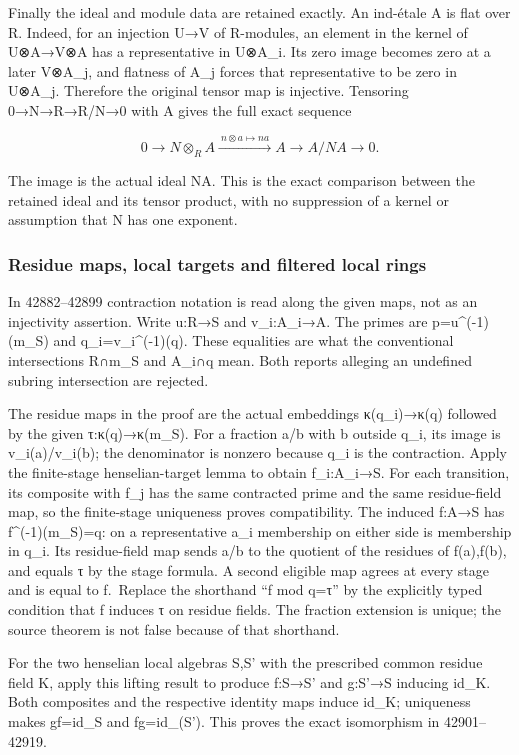 Finally the ideal and module data are retained exactly. An ind-étale A is flat over R. Indeed, for an injection U→V of R-modules, an element in the kernel of U⊗A→V⊗A has a representative in U⊗A\_i. Its zero image becomes zero at a later V⊗A\_j, and flatness of A\_j forces that representative to be zero in U⊗A\_j. Therefore the original tensor map is injective. Tensoring 0→N→R→R/N→0 with A gives the full exact sequence

\[
0\longrightarrow N\otimes_R A
 \xrightarrow{\ n\otimes a\mapsto na\ } A
 \longrightarrow A/NA\longrightarrow0.
\]

The image is the actual ideal NA. This is the exact comparison between the retained ideal and its tensor product, with no suppression of a kernel or assumption that N has one exponent.

\subsubsection{Residue maps, local targets and filtered local rings}\label{residue-maps-local-targets-and-filtered-local-rings}

In 42882--42899 contraction notation is read along the given maps, not as an injectivity assertion. Write u:R→S and v\_i:A\_i→A. The primes are p=u\^{}(-1)(m\_S) and q\_i=v\_i\^{}(-1)(q). These equalities are what the conventional intersections R∩m\_S and A\_i∩q mean. Both reports alleging an undefined subring intersection are rejected.

The residue maps in the proof are the actual embeddings κ(q\_i)→κ(q) followed by the given τ:κ(q)→κ(m\_S). For a fraction a/b with b outside q\_i, its image is v\_i(a)/v\_i(b); the denominator is nonzero because q\_i is the contraction. Apply the finite-stage henselian-target lemma to obtain f\_i:A\_i→S. For each transition, its composite with f\_j has the same contracted prime and the same residue-field map, so the finite-stage uniqueness proves compatibility. The induced f:A→S has f\^{}(-1)(m\_S)=q: on a representative a\_i membership on either side is membership in q\_i. Its residue-field map sends a/b to the quotient of the residues of f(a),f(b), and equals τ by the stage formula. A second eligible map agrees at every stage and is equal to f.~Replace the shorthand ``f mod q=τ'' by the explicitly typed condition that f induces τ on residue fields. The fraction extension is unique; the source theorem is not false because of that shorthand.

For the two henselian local algebras S,S' with the prescribed common residue field K, apply this lifting result to produce f:S→S' and g:S'→S inducing id\_K. Both composites and the respective identity maps induce id\_K; uniqueness makes gf=id\_S and fg=id\_(S'). This proves the exact isomorphism in 42901--42919.

